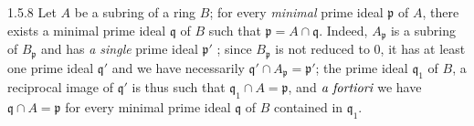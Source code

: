 \documentclass[../main.tex]{subfiles}
\begin{document}
\begin{env}{1.5.8}
Let $A$ be a subring of a ring $B$; for every \emph{minimal} prime ideal $\mathfrak{p}$ of $A$, there
exists a minimal prime ideal $\mathfrak{q}$ of $B$ such that $\mathfrak{p}=A\cap\mathfrak{q}$. Indeed, $A_\mathfrak{p}$
is a subring of $B_\mathfrak{p}$  and has \emph{a single} prime ideal $\mathfrak{p}'$ ; since
$B_\mathfrak{p}$ is not reduced to $0$, it has at least one prime ideal $\mathfrak{q}'$ and we have
necessarily $\mathfrak{q}'\cap A_\mathfrak{p}=\mathfrak{p}'$; the prime ideal $\mathfrak{q}_1$ of $B$, a reciprocal image
of $\mathfrak{q}'$ is thus such that $\mathfrak{q}_1\cap A=\mathfrak{p}$, and $\emph{a fortiori}$ we have
$\mathfrak{q}\cap A=\mathfrak{p}$ for every minimal prime ideal $\mathfrak{q}$ of $B$ contained in $\mathfrak{q}_1$.
\end{env}
\end{document}

